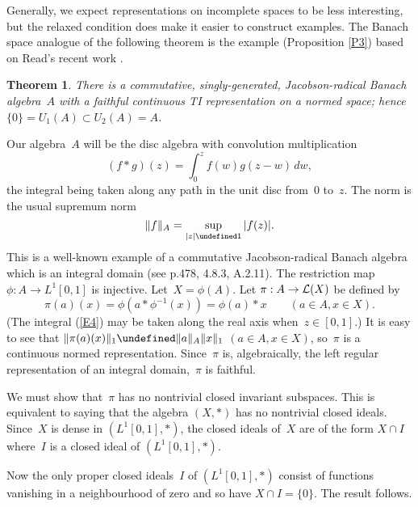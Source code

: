 \documentclass[11pt]{article}
\newcommand{\sseq}{\subseteq}
\let\leq\undefined  \let\geq\undefined
\let\le\leq   \let\ge\geq
\newcommand{\closure}[1]{\overline{#1}}
\newcommand{\dw}{dw}
\newcommand{\e}{\varepsilon}
\newtheorem{thm}{Theorem}[section]
\newenvironment{Proof}{{\it Proof. }}{}%
\newcommand{\Detail}[1]{}
\newcommand{\LX}{{\cal L}(X)}
\begin{document}
Generally, we expect representations on incomplete spaces to be less
interesting, but the relaxed condition does make it easier to construct
examples.   The Banach space analogue of the following theorem is the
example (Proposition \ref{P3}) based on Read's recent work \cite{Readqn}.

\begin{thm}
There is a commutative, singly-generated, Jacobson-radical Banach algebra~$A$
with a faithful continuous TI representation on a normed space; hence
$\{0\} = U_1(A) \subset U_2(A) = A$.
\end{thm}

\begin{Proof}
Our algebra~$A$ will be the disc algebra with convolution multiplication
\begin{equation}\label{E4}
(f*g)(z) = \int_0^z f(w)g(z-w)\,\dw,
\end{equation}
the integral being taken along any path in the unit disc from~0 to~$z$.
The norm is the usual supremum norm
$$\|f\|_A = \sup_{|z|\le 1} |f(z)|.$$
This is a well-known example of a commutative Jacobson-radical Banach algebra
which is an integral domain (see \cite{Hille} p.478,
\cite{Palmerbk} 4.8.3, \cite{Rickart} A.2.11).
The restriction map $\phi:A\to L^1[0,1]$ is injective.  Let~$X = \phi(A)$.
Let $\pi:A\to \LX$ be defined by
$$\pi(a)(x) = \phi(a*\phi^{-1}(x)) = \phi(a)*x \qquad (a \in A, x \in X).$$
(The integral (\ref{E4}) may be taken along the real axis when~$z \in [0,1]$.)
It is easy to see that $\|\pi(a)(x)\|_1 \le \|a\|_A\|x\|_1$ $(a \in A, x \in X)$,
so~$\pi$ is a continuous normed representation.   Since~$\pi$ is, algebraically,
the left regular representation of an integral domain,~$\pi$ is faithful.

We must show that~$\pi$ has no nontrivial closed invariant subspaces.
This is equivalent to saying that the algebra $(X,*)$ has no nontrivial
closed ideals.   Since~$X$ is dense in $(L^1[0,1],*)$, the closed ideals
of~$X$ are of the form $X \cap I$ where~$I$ is a closed ideal of $(L^1[0,1],*)$.
\Detail{If~$A$ is a dense subalgebra of a Banach algebra~$B$ and~$I$ is a closed
ideal of~$A$, then $J=\closure{I+BI+IB+BIB}$ is a closed ideal of~$B$ with
$I \sseq J\cap A$.  We show that $J \cap A \sseq I$.  If $y \in J \cap A$, then
for all $\e > 0$ there exist $x, x_i, x_i', x_i'' \in I$,
$b_i, b_i', b_i'', b_i''' \in B$  $(1 \le i \le n)$ such that
$$\|x + \sum b_ix_i + \sum x_i'b_i' + \sum b_i''x_i''b_i''' - y\| < \e/2.$$
Since~$A$ is dense in~$B$, we may then approximate the $b_i, b_i', b_i'', b_i'''$
by $a_i, a_i', a_i'', a_i'''$ so that
$$\|x + \sum a_ix_i + \sum x_i'a_i' + \sum a_i''x_i''a_i''' - y\| < \e.$$
Thus~$y$ may be approximated arbitrarily closely by elements of~$I$.   Since
$y \in A$ and~$I$ is closed in~$A$, it follows that $y \in I$.   The fact that
every $J\cap A$ is a closed ideal of~$A$ whenever~$J$ is a closed ideal of~$B$
is obvious.}
Now the only proper closed ideals~$I$ of $(L^1[0,1],*)$ consist of
functions vanishing in a neighbourhood of zero \cite{Donoghue} and so have
$X \cap I = \{0\}$.  The result follows.
\end{Proof}
\end{document}
